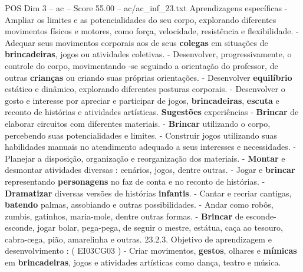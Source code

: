 \begin{textsample}{POS Dim 3 – ac – Score 55.00 – ac/ac\_inf\_23.txt}
Aprendizagens específicas - Ampliar os limites e as potencialidades do seu corpo, explorando diferentes movimentos físicos e motores, como força, velocidade, resistência e flexibilidade. - Adequar seus movimentos corporais aos de seus \textbf{colegas} em situações de \textbf{brincadeiras}, jogos ou atividades coletivas. - Desenvolver, progressivamente, o controle do corpo, movimentando -se seguindo a orientação do professor, de outras \textbf{crianças} ou criando suas próprias orientações. - Desenvolver \textbf{equilíbrio} estático e dinâmico, explorando diferentes posturas corporais. - Desenvolver o gosto e interesse por apreciar e participar de jogos, \textbf{brincadeiras}, \textbf{escuta} e reconto de histórias e atividades artísticas. \textbf{Sugestões} experiências - \textbf{Brincar} de elaborar circuitos com diferentes materiais. - \textbf{Brincar} utilizando o corpo, percebendo suas potencialidades e limites. - Construir jogos utilizando suas habilidades manuais no atendimento adequado a seus interesses e necessidades. - Planejar a disposição, organização e reorganização dos materiais. - \textbf{Montar} e desmontar atividades diversas : cenários, jogos, dentre outras. - Jogar e \textbf{brincar} representando \textbf{personagens} no faz de conta e no reconto de histórias. - \textbf{Dramatizar} diversas versões de histórias \textbf{infantis}. - Cantar e recriar cantigas, \textbf{batendo} palmas, assobiando e outras possibilidades. - Andar como robôs, zumbis, gatinhos, maria-mole, dentre outras formas. - \textbf{Brincar} de esconde-esconde, jogar bolar, pega-pega, de seguir o mestre, estátua, caça ao tesouro, cabra-cega, pião, amarelinha e outras. 23.2.3.
Objetivo de aprendizagem e desenvolvimento : ( EI03CG03 ) - Criar movimentos, \textbf{gestos}, olhares e \textbf{mímicas} em \textbf{brincadeiras}, jogos e atividades artísticas como dança, teatro e música.

\end{textsample}

